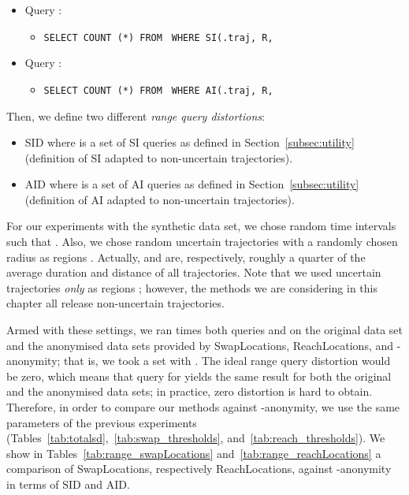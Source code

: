 \begin{itemize}
    \item Query :
    \begin{itemize}
        \item[] \texttt{SELECT COUNT (*) FROM } \texttt{WHERE SI(}\texttt{.traj, R, }
    \end{itemize}
    \item Query :
    \begin{itemize}
        \item[] \texttt{SELECT COUNT (*) FROM } \texttt{WHERE AI(}\texttt{.traj, R, }
    \end{itemize}
\end{itemize}

Then, we define two different \emph{range query distortions}:

\begin{itemize}
    \item SID
where  is a set of SI queries as defined in Section~\ref{subsec:utility}
(definition of SI adapted to non-uncertain trajectories).
    \item AID
where  is a set of AI queries as defined in Section~\ref{subsec:utility}
(definition of AI adapted to non-uncertain trajectories).
\end{itemize}

For our experiments with the synthetic data set, we chose random
time intervals  such that .
Also, we chose random uncertain trajectories with a randomly
chosen radius  as regions .
Actually,  and  are, respectively, roughly a quarter of
the average duration and distance of all trajectories. Note that
we used uncertain trajectories {\em only} as regions ; however,
the methods we are considering in this chapter all
release non-uncertain trajectories.

Armed with these settings, we ran  times
both queries  and  on the original data set
and the anonymised data sets provided by SwapLocations, ReachLocations,
and -anonymity; that is, we took a set  with
.
The ideal range query distortion would be zero,
which means that query  for  yields the same
result for both the original and the anonymised data sets; in practice,
zero distortion is hard to obtain. Therefore, in order to compare
our methods against -anonymity, we use the same parameters
of the previous experiments (Tables~\ref{tab:totalsd},~\ref{tab:swap_thresholds}, and~\ref{tab:reach_thresholds}).
We show in Tables~\ref{tab:range_swapLocations}
and~\ref{tab:range_reachLocations} a comparison of SwapLocations,
respectively ReachLocations, against -anonymity in terms
of SID and AID.

